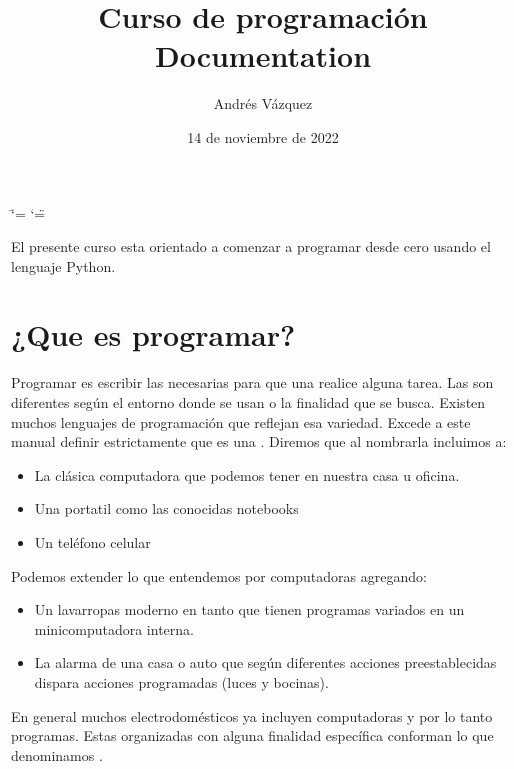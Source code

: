 \documentclass[a5paper,9pt,spanish]{sphinxmanual}
\title{Curso de programación Documentation}
\date{14 de noviembre de 2022}
\author{Andrés Vázquez}
\begin{document}
\ifdefined\shorthandoff
  \ifnum\catcode`\=\string=\active\shorthandoff{=}\fi
  \ifnum\catcode`\"=\active{}\fi
\fi

\pagestyle{empty}
\sphinxmaketitle
\pagestyle{plain}
\sphinxtableofcontents
\pagestyle{normal}
\label{\detokenize{index::doc}}


\sphinxAtStartPar
El presente curso esta orientado a comenzar a programar desde cero usando el lenguaje Python.

\sphinxstepscope


\chapter{¿Que es programar?}
\label{\detokenize{que:que-es-programar}}\label{\detokenize{que::doc}}
\sphinxAtStartPar
Programar es escribir las  necesarias para que una  realice alguna tarea.
Las  son diferentes según el entorno donde se usan o la finalidad que se busca.
Existen muchos lenguajes de programación que reflejan esa variedad.
Excede a este manual definir estrictamente que es una . Diremos que al nombrarla incluimos a:
\begin{itemize}
\item {} 
\sphinxAtStartPar
La clásica computadora que podemos tener en nuestra casa u oficina.

\item {} 
\sphinxAtStartPar
Una portatil como las conocidas notebooks

\item {} 
\sphinxAtStartPar
Un teléfono celular

\end{itemize}

\sphinxAtStartPar
Podemos extender lo que entendemos por computadoras agregando:
\begin{itemize}
\item {} 
\sphinxAtStartPar
Un lavarropas moderno en tanto que tienen programas variados en un mini\sphinxhyphen{}computadora interna.

\item {} 
\sphinxAtStartPar
La alarma de una casa o auto que según diferentes acciones pre\sphinxhyphen{}establecidas dispara acciones programadas (luces y bocinas).

\end{itemize}

\sphinxAtStartPar
En general muchos electrodomésticos ya incluyen computadoras y por lo tanto programas.
Estas  organizadas con alguna finalidad específica conforman lo que denominamos .
\end{document}
